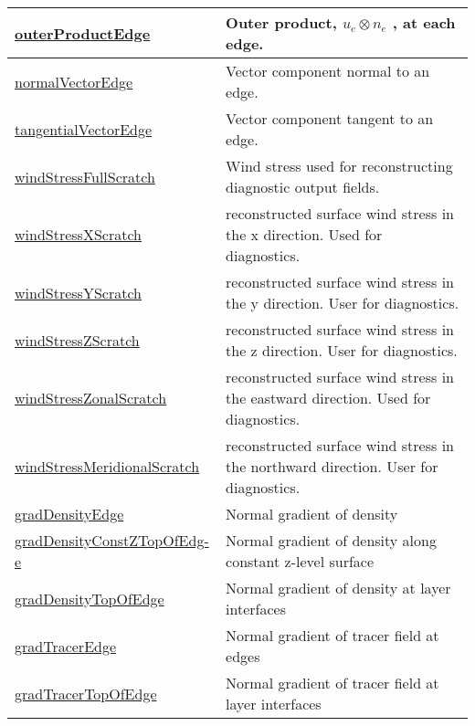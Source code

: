 {\begin{center}
\begin{longtable}{| p{2.0in} | p{4.0in} |}
	\hline
	\hyperref[subsec:var_sec_scratch_outerProductEdge]{outerProductEdge} &  Outer product,  $u_e \otimes n_e$ , at each edge. \\
	\hline
	\hyperref[subsec:var_sec_scratch_normalVectorEdge]{normalVectorEdge} & Vector component normal to an edge. \\
	\hline
	\hyperref[subsec:var_sec_scratch_tangentialVectorEdge]{tangentialVectorEdge} & Vector component tangent to an edge. \\
	\hline
	\hyperref[subsec:var_sec_scratch_windStressFullScratch]{windStressFullScratch} & Wind stress used for reconstructing diagnostic output fields. \\
	\hline
	\hyperref[subsec:var_sec_scratch_windStressXScratch]{windStressXScratch} & reconstructed surface wind stress in the x direction. Used for diagnostics. \\
	\hline
	\hyperref[subsec:var_sec_scratch_windStressYScratch]{windStressYScratch} & reconstructed surface wind stress in the y direction. User for diagnostics. \\
	\hline
	\hyperref[subsec:var_sec_scratch_windStressZScratch]{windStressZScratch} & reconstructed surface wind stress in the z direction. User for diagnostics. \\
	\hline
	\hyperref[subsec:var_sec_scratch_windStressZonalScratch]{windStressZonalScratch} & reconstructed surface wind stress in the eastward direction. Used for diagnostics. \\
	\hline
	\hyperref[subsec:var_sec_scratch_windStressMeridionalScratch]{windStressMeridionalScratch} & reconstructed surface wind stress in the northward direction. User for diagnostics. \\
	\hline
	\hyperref[subsec:var_sec_scratch_gradDensityEdge]{gradDensityEdge} & Normal gradient of density \\
	\hline
	\hyperref[subsec:var_sec_scratch_gradDensityConstZTopOfEdge]{gradDensityConstZTopOfEdg-}\hyperref[subsec:var_sec_scratch_gradDensityConstZTopOfEdge]{e  }& Normal gradient of density along constant z-level surface \\
	\hline
	\hyperref[subsec:var_sec_scratch_gradDensityTopOfEdge]{gradDensityTopOfEdge} & Normal gradient of density at layer interfaces \\
	\hline
	\hyperref[subsec:var_sec_scratch_gradTracerEdge]{gradTracerEdge} & Normal gradient of tracer field at edges \\
	\hline
	\hyperref[subsec:var_sec_scratch_gradTracerTopOfEdge]{gradTracerTopOfEdge} & Normal gradient of tracer field at layer interfaces \\

\end{longtable}
\end{center}}
